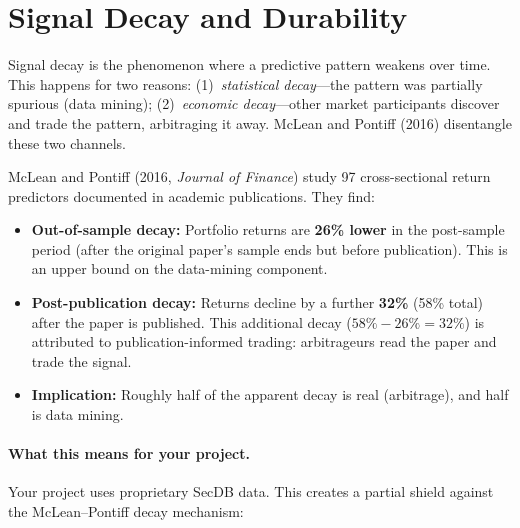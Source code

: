 \section{Signal Decay and Durability}
\label{sec:presenting:decay}

\begin{prereq}
Signal decay is the phenomenon where a predictive pattern weakens over
time.  This happens for two reasons: (1)~\emph{statistical decay}---the
pattern was partially spurious (data mining); (2)~\emph{economic
decay}---other market participants discover and trade the pattern,
arbitraging it away.  McLean and Pontiff (2016) disentangle these two
channels.
\end{prereq}

\begin{keyresult}
McLean and Pontiff (2016, \textit{Journal of Finance}) study 97
cross-sectional return predictors documented in academic publications.
They find:
\begin{itemize}[leftmargin=1.5em]
  \item \textbf{Out-of-sample decay:} Portfolio returns are \textbf{26\%
    lower} in the post-sample period (after the original paper's sample
    ends but before publication).  This is an upper bound on the
    data-mining component.
  \item \textbf{Post-publication decay:} Returns decline by a further
    \textbf{32\%} (58\% total) after the paper is published.
    This additional decay ($58\% - 26\% = 32\%$) is attributed to
    publication-informed trading: arbitrageurs read the paper and trade
    the signal.
  \item \textbf{Implication:} Roughly half of the apparent decay is real
    (arbitrage), and half is data mining.
\end{itemize}
\end{keyresult}

\paragraph{What this means for your project.}
Your project uses proprietary SecDB data.  This creates a partial shield
against the McLean--Pontiff decay mechanism:

